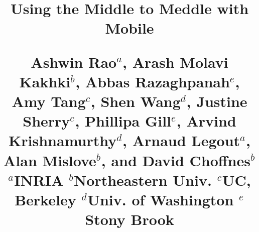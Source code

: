 \documentclass[letterpaper,twocolumn,10pt]{sig-alternate-10pt}
\begin{document}
\date{}

\title{{\Large \bf Using the Middle to Meddle with Mobile} 
\\
\vspace{1em}
\author{} 
\large Ashwin Rao${^a}$, Arash Molavi Kakhki${^b}$, Abbas Razaghpanah${^e}$, Amy Tang${^c}$, Shen Wang${^d}$, Justine Sherry${^c}$, %
Phillipa Gill${^e}$, \large Arvind Krishnamurthy${^d}$, Arnaud Legout${^a}$, Alan Mislove${^b}$, and David Choffnes${^b}$\\ 
\vspace{1em}
\large $^{a}$INRIA $^{b}$Northeastern Univ. $^{c}$UC, Berkeley $^{d}$Univ. of Washington  ${^e}$Stony Brook
\vspace{-3em}
} 

\maketitle
\vspace{-2em}




%



%







%






{\footnotesize 
}

\end{document}
